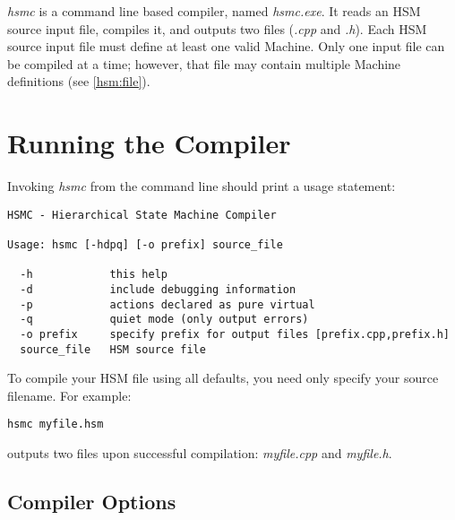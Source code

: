 \documentclass[titlepage,letterpaper]{report}
\begin{document}
\emph{hsmc} is a command line based compiler, named \emph{hsmc.exe}.  It reads an HSM
source input file, compiles it, and outputs two files (\emph{.cpp} and \emph{.h}).  Each HSM source 
input file must define at least one valid Machine.  Only one input file can be compiled 
at a time; however, that file may contain multiple Machine definitions (see \ref{hsm:file}).


\section{Running the Compiler}

Invoking \emph{hsmc} from the command line should print a usage statement:

\begin{verbatim}
HSMC - Hierarchical State Machine Compiler

Usage: hsmc [-hdpq] [-o prefix] source_file

  -h            this help
  -d            include debugging information
  -p            actions declared as pure virtual
  -q            quiet mode (only output errors)
  -o prefix     specify prefix for output files [prefix.cpp,prefix.h]
  source_file   HSM source file
\end{verbatim}


To compile your HSM file using all defaults, you need only specify your source
filename.  For example:

\begin{verbatim}
hsmc myfile.hsm
\end{verbatim}

outputs two files upon successful compilation: \emph{myfile.cpp} and \emph{myfile.h}.

\subsection{Compiler Options}

\label{hsmc:options}
\end{document}
